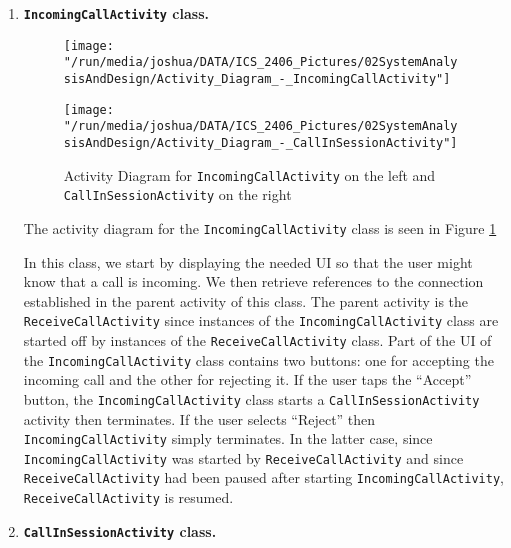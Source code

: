 \documentclass[12pt,svgnames,smaller]{article} %
\begin{document}
\begin{enumerate}
		\item \textbf{\texttt{IncomingCallActivity} class.} 
		
		\begin{figure}
			\centering
			\begin{minipage}{0.5\textwidth}
				\centering
				\texttt{[image: "/run/media/joshua/DATA/ICS\_2406\_Pictures/02SystemAnalysisAndDesign/Activity\_Diagram\_-\_IncomingCallActivity"]}
			\end{minipage}%
			\begin{minipage}{0.5\textwidth}
				\centering
				\texttt{[image: "/run/media/joshua/DATA/ICS\_2406\_Pictures/02SystemAnalysisAndDesign/Activity\_Diagram\_-\_CallInSessionActivity"]}
			\end{minipage}
			\caption{Activity Diagram for \texttt{IncomingCallActivity} on the left and \texttt{CallInSessionActivity} on the right}
			\label{fig:SystemAnalysisandDesign-Activity_Diagram_-_IncomingCallActivity,_CallInSessionActivity}		
		\end{figure}
		
		The activity diagram for the \texttt{IncomingCallActivity} class is seen in Figure \ref{fig:SystemAnalysisandDesign-Activity_Diagram_-_IncomingCallActivity,_CallInSessionActivity}
		
		In this class, we start by displaying the needed UI so that the user might know that a call is incoming. We then retrieve references to the connection established in the parent activity of this class. The parent activity is the \texttt{ReceiveCallActivity} since instances of the \texttt{IncomingCallActivity} class are started off by instances of the \texttt{ReceiveCallActivity} class. Part of the UI of the \texttt{IncomingCallActivity} class contains two buttons: one for accepting the incoming call and the other for rejecting it. If the user taps the “Accept” button, the \texttt{IncomingCallActivity} class starts a \texttt{CallInSessionActivity} activity then terminates. If the user selects “Reject” then \texttt{IncomingCallActivity} simply terminates. In the latter case, since \texttt{IncomingCallActivity} was started by \texttt{ReceiveCallActivity} and since \texttt{ReceiveCallActivity} had been paused after starting \texttt{IncomingCallActivity}, \texttt{ReceiveCallActivity} is resumed.
		
		\item \textbf{\texttt{CallInSessionActivity} class.} 
		

\end{enumerate}
\end{document}

